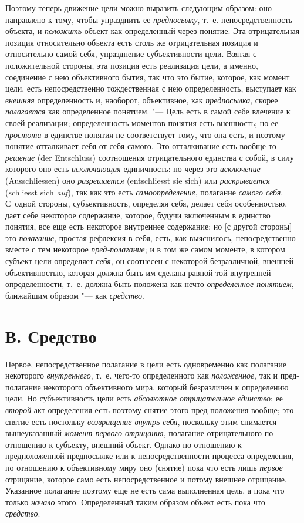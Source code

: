 {{Поэтому теперь движение цели можно выразить следующим образом:
оно направлено к тому, чтобы упразднить ее
{\em предпосылку}, т.~е.
непосредственность объекта, и
{\em положить} объект как
определенный через понятие. Эта отрицательная позиция относительно объекта
есть столь же отрицательная позиция и относительно самой себя, упразднение
субъективности цели. Взятая с положительной стороны, эта позиция есть
реализация цели, а именно, соединение с нею объективного бытия, так что это
бытие, которое, как момент цели, есть непосредственно тождественная с нею
определенность, выступает как
{\em внешняя}
определенность и, наоборот, объективное, как
{\em предпосылка}, скорее
{\em полагается} как
определенное понятием. "--- Цель есть в самой себе влечение к
своей реализации; определенность моментов понятия есть внешность; но ее
{\em простота} в единстве
понятия не соответствует тому, что она есть, и поэтому понятие отталкивает
себя от себя самого. Это отталкивание есть вообще то
{\em решение} (der Entschluss)
соотношения отрицательного единства с собой, в силу которого
оно есть {\em исключающая}
единичность: но через это
{\em исключение} (Ausschliessen)
оно {\em разрешается}
(entschliesst sie sich) или
{\em раскрывается} (schliesst sich
{\em auf}), так как это есть
{\em самоопределение},
полагание {\em самого
себя}. С~одной стороны, субъективность, определяя себя,
делает себя особенностью, дает себе некоторое содержание, которое, будучи
включенным в единство понятия, все еще есть некоторое внутреннее
содержание; но [с другой стороны] это
{\em полагание}, простая
рефлексия в себя, есть, как выяснилось, непосредственно вместе с тем
некоторое {\em пред-полагание};
и в том же самом моменте, в котором субъект цели определяет
{\em себя}, он соотнесен
с некоторой безразличной, внешней объективностью, которая должна быть им
сделана равной той внутренней определенности, т.~е. должна быть положена
как нечто {\em определенное понятием},
ближайшим образом "--- как
{\em средство}.

\section[В. Средство]{В. Средство}
Первое, непосредственное полагание в цели есть одновременно
как полагание некоторого
{\em внутреннего}, т.~е.
чего-то определенного как
{\em положенное}, так и
пред-полагание некоторого объективного мира, который безразличен к
определению цели. Но субъективность цели есть
{\em абсолютное отрицательное
единство}; ее
{\em второй} акт
определения есть поэтому снятие этого пред-положения вообще; это
снятие есть постольку
{\em возвращение внутрь себя},
поскольку этим снимается вышеуказанный
{\em момент первого отрицания},
полагание отрицательного по отношению к субъекту, внешний
объект. Однако по отношению к предположенной предпосылке или к
непосредственности процесса определения, по отношению к объективному миру
оно (снятие) пока что есть лишь
{\em первое} отрицание,
которое само есть непосредственное и потому внешнее отрицание. Указанное
полагание поэтому еще не есть сама выполненная цель, а пока что только
{\em начало} этого.
Определенный таким образом объект есть пока что
{\em средство}.

}}
